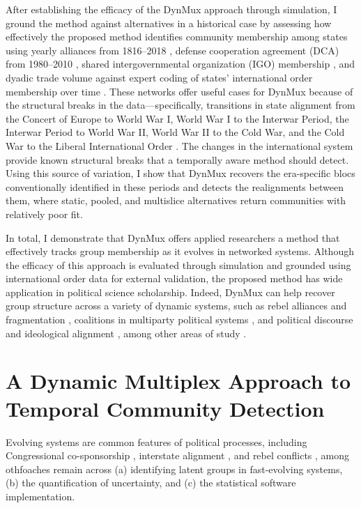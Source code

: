 \documentclass[11pt, letterpaper]{article}
\begin{document}
After establishing the efficacy of the DynMux approach through simulation, I ground the method against alternatives in a historical case by assessing how effectively the proposed method identifies community membership among states using yearly alliances from 1816--2018 \citep{leeds2002alliance}, defense cooperation agreement (DCA) from 1980--2010 \citep{kinne2020defense}, shared intergovernmental organization (IGO) membership \citep{pevehouse2020tracking, wallace1970intergovernmental}, and dyadic trade volume \citep{barbieri2009trading} against expert coding of states' international order membership over time \citep{braumoeller2019only}. These networks offer useful cases for DynMux because of the structural breaks in the data---specifically, transitions in state alignment from the Concert of Europe to World War I, World War I to the Interwar Period, the Interwar Period to World War II, World War II to the Cold War, and the Cold War to the Liberal International Order \citep{braumoeller2019only, ikenberry2018end}. The changes in the international system provide known structural breaks that a temporally aware method should detect. Using this source of variation, I show that DynMux recovers the era-specific blocs conventionally identified in these periods and detects the realignments between them, where static, pooled, and multislice alternatives return communities with relatively poor fit.

In total, I demonstrate that DynMux offers applied researchers a method that effectively tracks group membership as it evolves in networked systems. Although the efficacy of this approach is evaluated through simulation and grounded using international order data for external validation, the proposed method has wide application in political science scholarship. Indeed, DynMux can help recover group structure across a variety of dynamic systems, such as rebel alliances and fragmentation \citep{blair2022leadership, christia2012alliance, gade2019networks}, coalitions in multiparty political systems \citep{golder2012modeling, Samet2025AJPS, Volden2024ajps}, and political discourse and ideological alignment \citep{green2024rhetorical, naftel2025meet}, among other areas of study \citep{cao2009networks, Tavana2026AJPS}.


\section{A Dynamic Multiplex Approach to Temporal Community Detection}
Evolving systems are common features of political processes, including Congressional co-sponsorship \citep{craig2021takes, fowler2006connecting, victor2009social}, interstate alignment \citep{beardsley2024coevolution, gallop2021network, minhas2022taking}, and rebel conflicts \citep{dorff2020Nigeria, dorff2023network, vega2023measuring}, among othƒoaches remain across (a) identifying latent groups in fast-evolving systems, (b) the quantification of uncertainty, and (c) the statistical software implementation.
 
\end{document}
